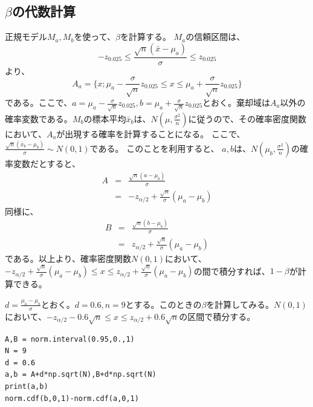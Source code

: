 \subsection{$\beta$の代数計算}
正規モデル$M_a,M_b$を使って、$\beta$を計算する。
$M_a$の信頼区間は、
\begin{equation*}
    -z_{0.025}\leq \frac{\sqrt{n}(\bar{x}-\mu_a)}{\sigma}\leq z_{0.025}
\end{equation*}
より、
\begin{equation*}
    A_a = \{ x ; \mu_a -\frac{\sigma}{\sqrt{n}}z_{0.025} \leq x \leq \mu_a +\frac{\sigma}{\sqrt{n}}z_{0.025} \}
\end{equation*}
である。ここで、$a=\mu_a -\frac{\sigma}{\sqrt{n}}z_{0.025},b = \mu_a +\frac{\sigma}{\sqrt{n}}z_{0.025} $とおく。棄却域は$A_a$以外の確率変数である。$M_b$の標本平均$\bar{x}_b$は、$N(\mu,\frac{\sigma^2}{n})$に従うので、その確率密度関数において、$A_a$が出現する確率を計算することになる。
ここで、$\frac{\sqrt{n}(\bar{x}_b-\mu_b)}{\sigma}\sim N(0,1)$である。
このことを利用すると、
$a,b$は、$N(\mu_b,\frac{\sigma^2}{n})$の確率変数だとすると、
\begin{eqnarray*}
    A &=& \frac{\sqrt{n}(a-\mu_b)}{\sigma} \\
    &=& -z_{\alpha/2}+\frac{\sqrt{n}}{\sigma}(\mu_a-\mu_b)
\end{eqnarray*}
同様に、
\begin{eqnarray*}
    B &=& \frac{\sqrt{n}(b-\mu_b)}{\sigma} \\
    &=& z_{\alpha/2}+\frac{\sqrt{n}}{\sigma}(\mu_a-\mu_b)
\end{eqnarray*}
である。以上より、確率密度関数$N(0,1)$において、$-z_{\alpha/2}+\frac{\sqrt{n}}{\sigma}(\mu_a-\mu_b) \leq x\leq  z_{\alpha/2}+\frac{\sqrt{n}}{\sigma}(\mu_a-\mu_b)$の間で積分すれば、$1-\beta$が計算できる。

$d=\frac{\mu_a-\mu_b}{\sigma}$とおく。$d=0.6,n=9$とする。このときの$\beta$を計算してみる。$N(0,1)$において、$-z_{\alpha/2} -0.6\sqrt{n} \leq x \leq z_{\alpha/2} +0.6\sqrt{n}$の区間で積分する。

\begin{lstlisting}
A,B = norm.interval(0.95,0.,1)
N = 9
d = 0.6
a,b = A+d*np.sqrt(N),B+d*np.sqrt(N)
print(a,b)
norm.cdf(b,0,1)-norm.cdf(a,0,1)
\end{lstlisting}

